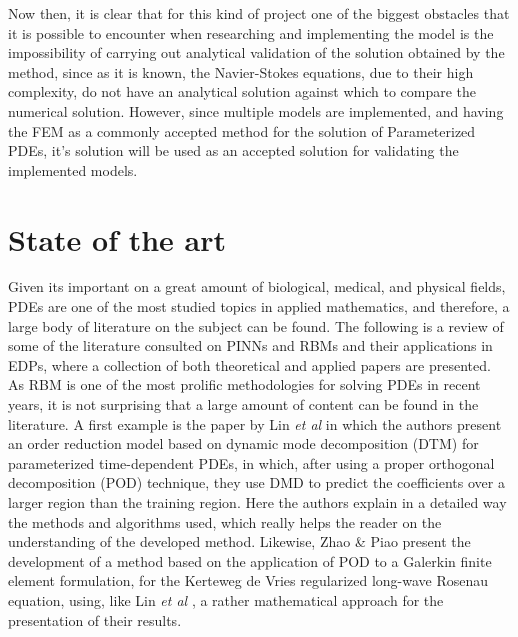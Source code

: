 \documentclass[12pt,letterpaper]{article}
\begin{document}
Now then, it is clear that for this kind of project one of the biggest obstacles that it is possible to encounter when researching and implementing the model is the impossibility of carrying out analytical validation of the solution obtained by the method, since as it is known, the Navier-Stokes equations, due to their high complexity, do not have an analytical solution against which to compare the numerical solution. However, since multiple models are implemented, and having the FEM as a commonly accepted method for the solution of Parameterized PDEs, it's solution will be used as an accepted solution for validating the implemented models.


\section{State of the art}

Given its important on a great amount of biological, medical, and physical fields, PDEs are one of the most studied topics in applied mathematics, and therefore, a large body of literature on the subject can be found. The following is a review of some of the literature consulted on PINNs and RBMs and their applications in EDPs, where a collection of both theoretical and applied papers are presented.\\

As RBM is one of the most prolific methodologies for solving PDEs in recent years, it is not surprising that a large amount of content can be found in the literature. A first example is the paper by Lin \textit{et al} \cite{lin2023dynamic} in which the authors present an order reduction model based on dynamic mode decomposition (DTM) for parameterized time-dependent PDEs, in which, after using a proper orthogonal decomposition (POD) technique, they use DMD to predict the coefficients over a larger region than the training region. Here the authors explain in a detailed way the methods and algorithms used, which really helps the reader on the understanding of the developed method. Likewise, Zhao \& Piao \cite{zhao2023reduced} present the development of a method based on the application of POD to a Galerkin finite element formulation, for the Kerteweg de Vries regularized long-wave Rosenau equation, using, like Lin \textit{et al} \cite{lin2023dynamic}, a rather mathematical approach for the presentation of their results. \\
\end{document}
